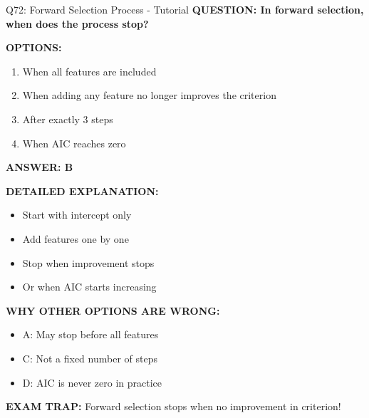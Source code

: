 \documentclass[8pt]{beamer}
\begin{document}
	\begin{frame}{Q72: Forward Selection Process - Tutorial}
		\fontsize{6.5}{7.5}\selectfont
		\textbf{QUESTION: In forward selection, when does the process stop?}
		
		\vspace{0.1cm}
		\textbf{OPTIONS:}
		\begin{enumerate}
			\item When all features are included
			\item When adding any feature no longer improves the criterion
			\item After exactly 3 steps
			\item When AIC reaches zero
		\end{enumerate}
		
		\vspace{0.1cm}
		\textcolor{myblue}{\textbf{ANSWER: B}}
		
		\vspace{0.1cm}
		\textbf{DETAILED EXPLANATION:}
		\begin{itemize}
			\item Start with intercept only
			\item Add features one by one
			\item Stop when improvement stops
			\item Or when AIC starts increasing
		\end{itemize}
		
		\vspace{0.1cm}
		\textcolor{myred}{\textbf{WHY OTHER OPTIONS ARE WRONG:}}
		\begin{itemize}
			\item \textcolor{myred}{A:} May stop before all features
			\item \textcolor{myred}{C:} Not a fixed number of steps
			\item \textcolor{myred}{D:} AIC is never zero in practice
		\end{itemize}
		
		\textcolor{myred}{\textbf{EXAM TRAP:}} Forward selection stops when \textcolor{myblue}{no improvement in criterion}!
	\end{frame}
	
\end{document}
